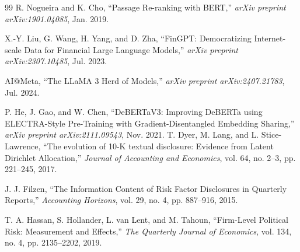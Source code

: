 \documentclass[journal]{IEEEtran}
\begin{document}
\begin{thebibliography}{99}
R. Nogueira and K. Cho, ``Passage Re-ranking with BERT,'' \textit{arXiv preprint arXiv:1901.04085}, Jan. 2019.

X.-Y. Liu, G. Wang, H. Yang, and D. Zha, ``FinGPT: Democratizing Internet-scale Data for Financial Large Language Models,'' \textit{arXiv preprint arXiv:2307.10485}, Jul. 2023.

AI@Meta, ``The LLaMA 3 Herd of Models,'' \textit{arXiv preprint arXiv:2407.21783}, Jul. 2024.

P. He, J. Gao, and W. Chen, ``DeBERTaV3: Improving DeBERTa using ELECTRA-Style Pre-Training with Gradient-Disentangled Embedding Sharing,'' \textit{arXiv preprint arXiv:2111.09543}, Nov. 2021.
T. Dyer, M. Lang, and L. Stice-Lawrence, ``The evolution of 10-K textual disclosure: Evidence from Latent Dirichlet Allocation,'' \textit{Journal of Accounting and Economics}, vol. 64, no. 2--3, pp. 221--245, 2017.

J. J. Filzen, ``The Information Content of Risk Factor Disclosures in Quarterly Reports,'' \textit{Accounting Horizons}, vol. 29, no. 4, pp. 887--916, 2015.

T. A. Hassan, S. Hollander, L. van Lent, and M. Tahoun, ``Firm-Level Political Risk: Measurement and Effects,'' \textit{The Quarterly Journal of Economics}, vol. 134, no. 4, pp. 2135--2202, 2019.
\end{thebibliography}
\end{document}
